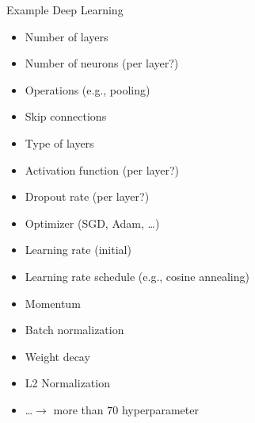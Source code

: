 \begin{frame}[c]{Example Deep Learning}

\begin{itemize}
  \item Number of layers
  \item Number of neurons (per layer?)
  \item Operations (e.g., pooling)
  \item Skip connections
  \item Type of layers 
  \item Activation function (per layer?)
  \item Dropout rate (per layer?)
  \item Optimizer (SGD, Adam, \ldots)
  \item Learning rate (initial)
  \item Learning rate schedule (e.g., cosine annealing)
  \item Momentum
  \item Batch normalization
  \item Weight decay
  \item L2 Normalization
  \item \ldots $\to$ more than $70$ hyperparameter
\end{itemize}


\end{frame}


